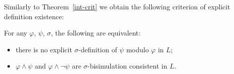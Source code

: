 \documentclass{lmcs} %
\theoremstyle{plain}\newtheorem{satz}[thm]{Satz} %
\newcommand{\nz}[1]{\textcolor{blue}{\bf!}%
	\marginpar[\parbox{15mm}{\raggedleft\scriptsize\textcolor{blue}{#1}}]%
	{\parbox{15mm}{\raggedright\scriptsize\textcolor{blue}{#1}}}}
\newcommand{\QSF}{\ensuremath{\smash{\mathsf{Q^1S5}}}}
\newcommand{\QK}{\ensuremath{\smash{\mathsf{Q^1K}}}}
\newcommand{\bs}{\boldsymbol{\beta}}
\newcommand{\fform}[1]{\boldsymbol{#1}}
\newcommand{\pvar}{\fform{p}}
\newcommand{\qvar}{\fform{q}}
\newcommand{\avar}{\fform{a}}
\begin{document}
\begin{exa}
\end{exa}

Similarly to Theorem~\ref{int-crit} we obtain the following criterion of explicit definition existence:

\begin{thm}\label{p:pbdpsem}
For any $\varphi$, $\psi$, $\sigma$, the following are equivalent\textup{:}
%
\begin{itemize}
\item[--]
there is no explicit $\sigma$-definition of $\psi$ modulo $\varphi$ in $L$\textup{;}

\item[--]
$\varphi\land \psi$ and $\varphi\land\neg \psi$ are $\sigma$-bisimulation consistent in $L$. 
\end{itemize}
\end{thm}
\end{document}
